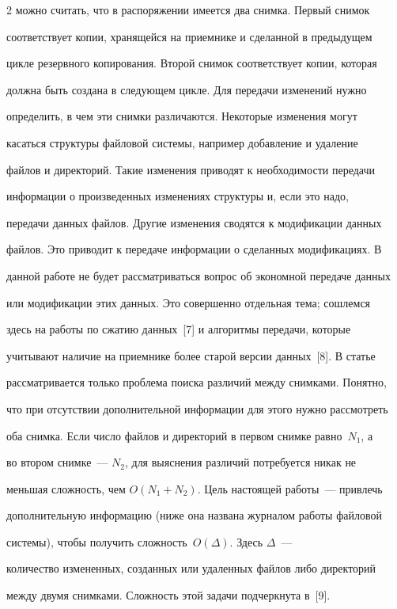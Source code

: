 \begin{multicols}{2}
можно считать, что в распоряжении имеется два снимка. Первый снимок 


соответствует копии, хранящейся на приемнике и сделанной в предыдущем 


цикле резервного копирования. Второй снимок соответствует копии, которая 


должна быть создана в следующем цикле. Для передачи изменений нужно 


определить, в чем эти снимки различаются.  Некоторые изменения могут 


касаться структуры файловой сис\-те\-мы, например добавление и удаление 


файлов и директорий. Такие изменения приводят к необходимости передачи 


информации о произведенных изменениях структуры и, если это надо, 


передачи данных файлов.  Другие изменения сводятся к модификации данных 


файлов. Это приводит к передаче информации о сделанных модификациях. В 


данной работе не будет рассматриваться вопрос об экономной передаче данных 


или модификации этих данных. Это совершенно отдельная тема; сошлемся 


здесь на работы по сжатию данных~[7] и  алгоритмы передачи, которые 


учитывают наличие на приемнике более старой версии данных~[8]. В статье 


рассматривается только проблема поиска различий между снимками. Понятно, 


что при отсутствии дополнительной информации для этого нужно рассмотреть 


оба снимка. Если число файлов и директорий в первом снимке равно~$N_1$, а 


во втором снимке~--- $N_2$, для выяснения различий потребуется никак не 


меньшая сложность, чем $O(N_1+N_2)$. Цель настоящей работы~--- привлечь 


дополнительную информацию (ниже она названа журналом работы файловой 


сис\-те\-мы), чтобы получить сложность~$O(\Delta)$. Здесь $\Delta$~--- 


количество измененных, созданных или удаленных файлов либо директорий 


между двумя снимками. Сложность этой задачи подчеркнута в~[9].



\end{multicols}
